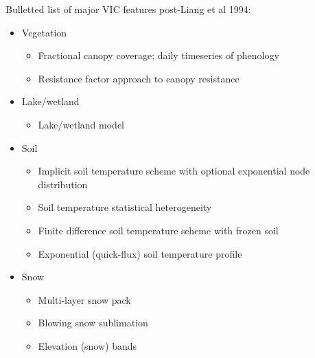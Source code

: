 \documentclass[gmd, manuscript]{copernicus}
\begin{document}
Bulletted list of major VIC features post-Liang et al 1994:
\begin{itemize}
\item Vegetation
\begin{itemize}
\item Fractional canopy coverage; daily timeseries of phenology \citep{Bohn_2016}
\item Resistance factor approach to canopy resistance \citep{Wigmosta_1994}
\end{itemize}
\item Lake/wetland
\begin{itemize}
\item Lake/wetland model \citep{Cherkauer_2003, Bowling_2010}
\end{itemize}
\item Soil
\begin{itemize}
\item Implicit soil temperature scheme with optional exponential node distribution \citep{Adam_2008}
\item Soil temperature statistical heterogeneity \citep{Cherkauer_2003}
\item Finite difference soil temperature scheme with frozen soil\citep{Cherkauer_1999}
\item Exponential (quick-flux) soil temperature profile \citep{Liang_1999}
\end{itemize}
\item Snow
\begin{itemize}
\item Multi-layer snow pack \citep{Cherkauer_1999, Andreadis_2009}
\item Blowing snow sublimation \citep{Bowling_2004}
\item Elevation (snow) bands \citep{Nijssen_1997}
\end{itemize}
\end{itemize}
\end{document}
